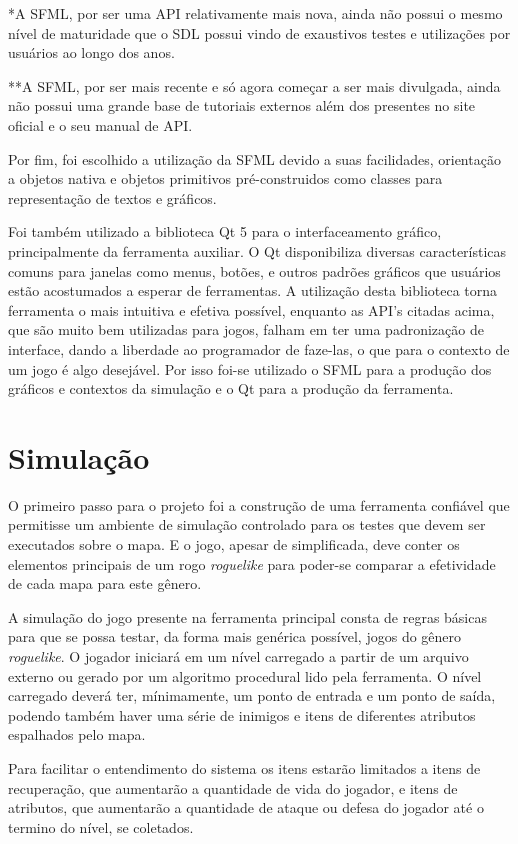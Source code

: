*A SFML, por ser uma API relativamente mais nova, ainda não possui o mesmo nível de maturidade que o SDL possui vindo de exaustivos testes e utilizações por usuários ao longo dos anos.

**A SFML, por ser mais recente e só agora começar a ser mais divulgada, ainda não possui uma grande base de tutoriais externos além dos presentes no site oficial e o seu manual de API.

Por fim, foi escolhido a utilização da SFML devido a suas facilidades, orientação a objetos nativa e objetos primitivos pré-construidos como classes para representação de textos e gráficos.

Foi também utilizado a biblioteca Qt 5 para o interfaceamento gráfico, principalmente da ferramenta auxiliar. O Qt disponibiliza diversas características comuns para janelas como menus, botões, e outros padrões gráficos que usuários estão acostumados a esperar de ferramentas. A utilização desta biblioteca torna ferramenta o mais intuitiva e efetiva possível, enquanto as API's citadas acima, que são muito bem utilizadas para jogos, falham em ter uma padronização de interface, dando a liberdade ao programador de faze-las, o que para o contexto de um jogo é algo desejável. Por isso foi-se utilizado o SFML para a produção dos gráficos e contextos da simulação e o Qt para a produção da ferramenta.

\section{Simulação}

O primeiro passo para o projeto foi a construção de uma ferramenta confiável que permitisse um ambiente de simulação controlado para os testes que devem ser executados sobre o mapa. E o jogo, apesar de simplificada, deve conter os elementos principais de um rogo \textit{roguelike} para poder-se comparar a efetividade de cada mapa para este gênero.

A simulação do jogo presente na ferramenta principal consta de regras básicas para que se possa testar, da forma mais genérica possível, jogos do gênero \textit{roguelike}. O jogador iniciará em um nível carregado a partir de um arquivo externo ou gerado por um algoritmo procedural lido pela ferramenta. O nível carregado deverá ter, mínimamente, um ponto de entrada e um ponto de saída, podendo também haver uma série de inimigos e itens de diferentes atributos espalhados pelo mapa. 

Para facilitar o entendimento do sistema os itens estarão limitados a itens de recuperação, que aumentarão a quantidade de vida do jogador, e itens de atributos, que aumentarão a quantidade de ataque ou defesa do jogador até o termino do nível, se coletados.

